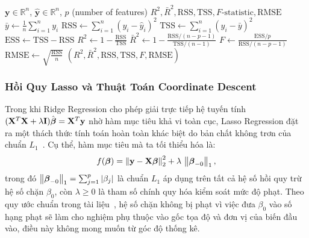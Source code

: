 \begin{algorithm}[H]
\caption{Model Evaluation Metrics}
\begin{algorithmic}[1]
\Require $\mathbf{y} \in \mathbb{R}^n$, $\hat{\mathbf{y}} \in \mathbb{R}^n$, $p$ (number of features)
\Ensure $R^2, \bar{R}^2, \text{RSS}, \text{TSS}, F\text{-statistic}, \text{RMSE}$
\State $\bar{y} \gets \frac{1}{n}\sum_{i=1}^n y_i$ 
\State $\text{RSS} \gets \sum_{i=1}^n (y_i - \hat{y}_i)^2$ 
\State $\text{TSS} \gets \sum_{i=1}^n (y_i - \bar{y})^2$ 
\State $\text{ESS} \gets \text{TSS} - \text{RSS}$ 
\State $R^2 \gets 1 - \frac{\text{RSS}}{\text{TSS}}$ 
\State $\bar{R}^2 \gets 1 - \frac{\text{RSS}/(n-p-1)}{\text{TSS}/(n-1)}$ 
\State $F \gets \frac{\text{ESS}/p}{\text{RSS}/(n-p-1)}$ 
\State $\text{RMSE} \gets \sqrt{\frac{\text{RSS}}{n}}$ 
\State \Return $(R^2, \bar{R}^2, \text{RSS}, \text{TSS}, F, \text{RMSE})$
\end{algorithmic}
\end{algorithm}

\subsubsection{Hồi Quy Lasso và Thuật Toán Coordinate Descent}


Trong khi Ridge Regression cho phép giải trực tiếp hệ tuyến tính
$(\mathbf{X}^T\mathbf{X} + \lambda\mathbf{I})\hat{\boldsymbol{\beta}} = \mathbf{X}^T\mathbf{y}$
nhờ hàm mục tiêu khả vi toàn cục, Lasso Regression đặt ra một thách thức tính toán hoàn
toàn khác biệt do bản chất không trơn của chuẩn $L_1$~\cite{tibshirani1996}. Cụ thể,
hàm mục tiêu mà ta tối thiểu hóa là:
\begin{equation}
    f(\boldsymbol{\beta})
    = \left\lVert\mathbf{y} - \mathbf{X}\boldsymbol{\beta}\right\rVert_2^2
    + \lambda\,\left\lVert\boldsymbol{\beta}_{-0}\right\rVert_1,
    \label{eq:lasso_obj}
\end{equation}
trong đó $\left\lVert\boldsymbol{\beta}_{-0}\right\rVert_1 = \sum_{j=1}^{p}|\beta_j|$ là chuẩn $L_1$
áp dụng trên tất cả hệ số hồi quy trừ hệ số chặn $\beta_0$, còn $\lambda \geq 0$ là
tham số chính quy hóa kiểm soát mức độ phạt. Theo quy ước chuẩn trong tài
liệu~\cite{tibshirani1996, james2013}, hệ số chặn không bị phạt vì việc đưa $\beta_0$
vào số hạng phạt sẽ làm cho nghiệm phụ thuộc vào gốc tọa độ và đơn vị của biến đầu
vào, điều này không mong muốn từ góc độ thống kê.

